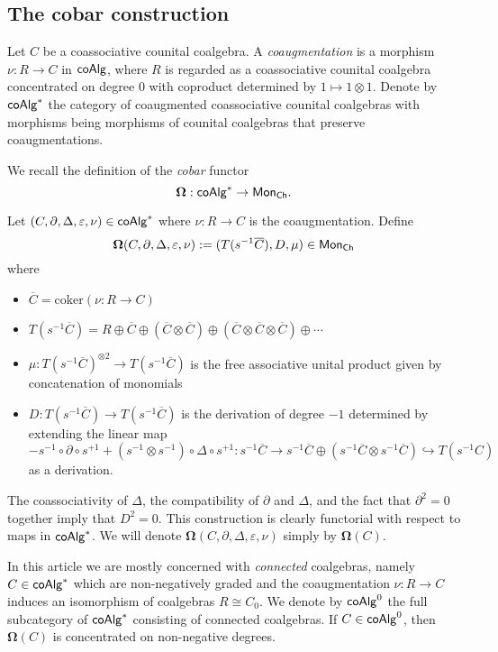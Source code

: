 

\subsection{The cobar construction}

Let $C$ be a coassociative counital coalgebra. A \textit{coaugmentation} is a morphism $\nu: R \to C$ in $\mathsf{coAlg}$, where $R$ is regarded as a coassociative counital coalgebra concentrated on degree $0$ with coproduct determined by $1 \mapsto 1 \otimes 1$. Denote by $\mathsf{coAlg}^*$ the category of coaugmented coassociative counital coalgebras with morphisms being morphisms of counital coalgebras that preserve coaugmentations. 

We recall the definition of the \textit{cobar} functor 
$$\mathbf{\Omega}: \mathsf{coAlg}^* \to \mathsf{Mon}_{\mathsf{Ch}}.$$

Let  $(C, \partial, \Delta, \varepsilon, \nu)  \in \mathsf{coAlg}^*$ where $\nu: R \to C$ is the coaugmentation. Define
$$\mathbf{\Omega}(C, \partial, \Delta, \varepsilon, \nu) := ( T(s^{-1}  \overline{C} ), D, \mu) \in \mathsf{Mon}_{\mathsf{Ch}}$$ where 
\begin{itemize}
\item $\overline{C}=\text{coker}(\nu: R \to C)$
\item $T(s^{-1} \overline{C})= R \oplus \overline{C} \oplus (\overline{C}  \otimes \overline{C} ) \oplus ( \overline{C} \otimes \overline{C} \otimes \overline{C} ) \oplus\cdots $
\item $\mu: T(s^{-1}  \overline{C} )^{\otimes 2} \to T(s^{-1}  \overline{C} ) $ is the free associative unital product given by concatenation of monomials
\item $D: T(s^{-1}  \overline{C} ) \to T(s^{-1}  \overline{C} )$ is the derivation of degree $-1$ determined by extending the linear map $$- s^{-1} \circ \partial \circ s^{+1} + (s^{-1} \otimes s^{-1}) \circ \Delta \circ s^{+1}: s^{-1}\overline{C} \to s^{-1}\overline{C} \oplus (s^{-1}\overline{C} \otimes s^{-1}\overline{C}) \hookrightarrow T(s^{-1}C)$$ as a derivation.
\end{itemize}

The coassociativity of $\Delta$, the compatibility of $\partial$ and $\Delta$, and the fact that $\partial^2 =0$ together imply that $D^2=0$. This construction is clearly functorial with respect to maps in $\mathsf{coAlg}^*$. We will denote $\mathbf{\Omega} (C, \partial, \Delta, \varepsilon, \nu)$ simply by $\mathbf{\Omega}(C)$. 

In this article we are mostly concerned with \textit{connected} coalgebras, namely $C \in \mathsf{coAlg}^*$ which are non-negatively graded and the coaugmentation $\nu: R \to C$ induces an isomorphism of coalgebras $R \cong C_0$. We denote by $\mathsf{coAlg}^0$ the full subcategory of $\mathsf{coAlg}^*$ consisting of connected coalgebras. If $C \in \mathsf{coAlg}^0$, then $\mathbf{\Omega}(C)$ is concentrated on non-negative degrees. 

